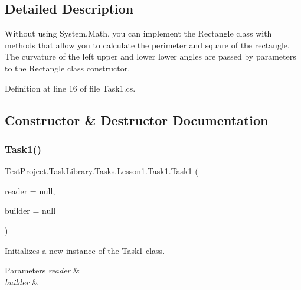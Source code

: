 \subsection{Detailed Description}
Without using System.\+Math, you can implement the Rectangle class with methods that allow you to calculate the perimeter and square of the rectangle. The curvature of the left upper and lower lower angles are passed by parameters to the Rectangle class constructor. 



Definition at line 16 of file Task1.\+cs.



\subsection{Constructor \& Destructor Documentation}
\mbox{\label{class_test_project_1_1_task_library_1_1_tasks_1_1_lesson1_1_1_task1_a85410dd09234849ea3e2704766f0b013}} 
\subsubsection{\texorpdfstring{Task1()}{Task1()}}
{\footnotesize\ttfamily Test\+Project.\+Task\+Library.\+Tasks.\+Lesson1.\+Task1.\+Task1 (\begin{DoxyParamCaption}\item[{I\+Reader}]{reader = {\ttfamily null},  }\item[{I\+Builder$<$ \mbox{\hyperlink{class_test_project_1_1_task_library_1_1_tasks_1_1_lesson1_1_1_models_1_1_rectangle}{Rectangle}} $>$}]{builder = {\ttfamily null} }\end{DoxyParamCaption})}



Initializes a new instance of the \mbox{\hyperlink{class_test_project_1_1_task_library_1_1_tasks_1_1_lesson1_1_1_task1}{Task1}} class. 


\begin{DoxyParams}{Parameters}
{\em reader} & \\
\hline
{\em builder} & \\
\hline
\end{DoxyParams}


